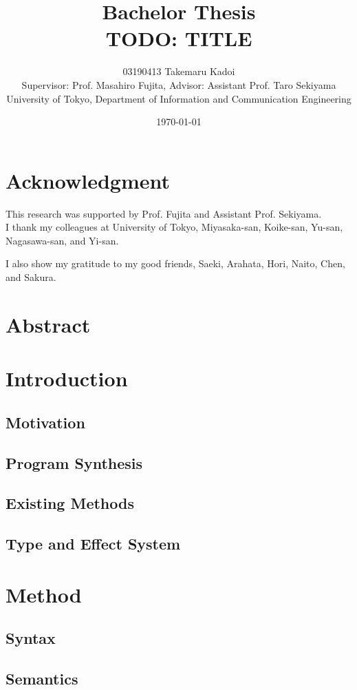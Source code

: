 \documentclass[10pt, a4paper, titlepage]{article}
\title{Bachelor Thesis \\ TODO: TITLE}
\author{
  03190413 Takemaru Kadoi
  \\[1cm]
  {\small Supervisor: Prof. Masahiro Fujita},
  {\small Advisor: Assistant Prof. Taro Sekiyama}
  \\[1cm]
  {\small University of Tokyo, Department of Information and Communication Engineering}
}
\date{\today}
\begin{document}
\maketitle
\newpage
\tableofcontents
\newpage

\section{Acknowledgment}
This research was supported by Prof. Fujita and Assistant Prof. Sekiyama. \\
I thank my colleagues at University of Tokyo, Miyasaka-san, Koike-san, Yu-san, Nagasawa-san, and Yi-san.

I also show my gratitude to my good friends, Saeki, Arahata, Hori, Naito, Chen, and Sakura.

\section{Abstract} %

\cite{gulwani2017program}

\section{Introduction}
  \subsection{Motivation}
  \subsection{Program Synthesis}
  \subsection{Existing Methods}
  \subsection{Type and Effect System}

\section{Method} %
  \subsection{Syntax}
  \subsection{Semantics}
\end{document}
